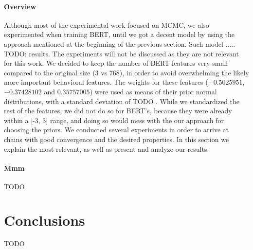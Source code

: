 \documentclass[man, floatsintext, 10pt]{apa6}
\begin{document}
\paragraph{Overview} Although most of the experimental work focused on MCMC, we also experimented when training BERT, until we got a decent model by using the approach mentioned at the beginning of the previous section. Such model ..... TODO: results. The experiments will not be discussed as they are not relevant for this work. We decided to keep the number of BERT features very small compared to the original size (3 vs 768), in order to avoid overwhelming the likely more important behavioral features. The weights for these features ($-0.5025951$, $-0.37428102$ and $0.35757005$) were used as means of their prior normal distributions, with a standard deviation of TODO . While we standardized the rest of the features, we did not do so for BERT's, because they were already within a [-3, 3] range, and doing so would mess with the our approach for choosing the priors. We conducted several experiments in order to arrive at chains with good convergence and the desired properties. In this section we explain the most relevant, as well as present and analyze our results. 

\vspace{2mm}

\paragraph{Mmm} TODO

\section{Conclusions} 

TODO
\end{document}
